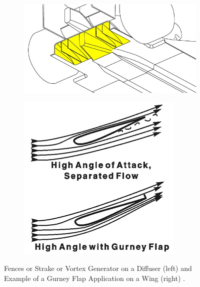 \begin{figure}[!ht]
\begin{center}
%    
  \begin{subfigure}[b]{0.4\textwidth}
    \includegraphics[scale=0.6]{Figures/diffuser_fences.jpg}
  \end{subfigure}
  \begin{subfigure}[b]{0.4\textwidth}
    \includegraphics[scale=0.8]{Figures/Gurney.jpg}
  \end{subfigure}
%  
  \caption{Fences or Strake or Vortex Generator on a Diffuser (left) and Example of a Gurney Flap Application on a Wing (right) \cite{Anonymous2020GurneyFlap}.}
    \label{fig:gurney}
\end{center}
\end{figure}